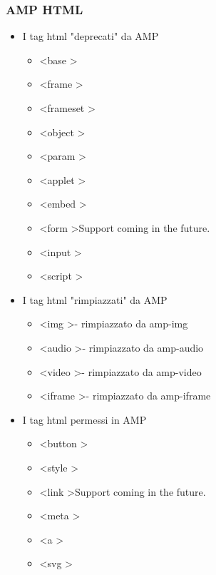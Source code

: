 \documentclass{article}
\begin{document}
\subsubsection{AMP HTML}
    \begin{itemize}
        \item I tag html "deprecati" da AMP
        \begin{itemize}
            \item \textless base \textgreater
            \item \textless frame \textgreater
            \item \textless frameset \textgreater
            \item \textless object \textgreater
            \item \textless param \textgreater
            \item \textless applet \textgreater
            \item \textless embed \textgreater
            \item \textless form \textgreater Support coming in the future.
            \item \textless input \textgreater
            \item \textless script \textgreater
        \end{itemize}
        \item I tag html "rimpiazzati" da AMP
        \begin{itemize}
            \item \textless img \textgreater - rimpiazzato da amp-img
            \item \textless audio \textgreater - rimpiazzato da amp-audio
            \item \textless video \textgreater - rimpiazzato da amp-video
            \item \textless iframe \textgreater - rimpiazzato da amp-iframe
        \end{itemize}
        \item I tag html permessi in  AMP
        \begin{itemize}
            \item \textless button \textgreater
            \item \textless style \textgreater
            \item \textless link \textgreater Support coming in the future.
            \item \textless meta \textgreater
            \item \textless a \textgreater
            \item \textless svg \textgreater
        \end{itemize}
    \end{itemize}
\end{document}

